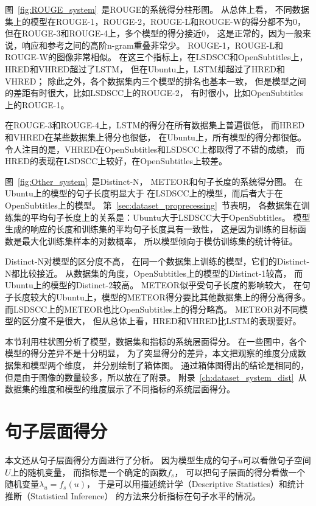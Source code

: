 
图~\ref{fig:ROUGE_system}~是ROUGE的系统得分柱形图。 从总体上看， 不同数据集上的模型在ROUGE-1，ROUGE-2，ROUGE-L和ROUGE-W的得分都不为0， 但在ROUGE-3和ROUGE-4上，多个模型的得分接近0， 这是正常的，因为一般来说，响应和参考之间的高阶n-gram重叠非常少。 ROUGE-1，ROUGE-L和ROUGE-W的图像非常相似。 在这三个指标上，在LSDSCC和OpenSubtitles上，HRED和VHRED超过了LSTM， 但在Ubuntu上，LSTM却超过了HRED和VHRED； 除此之外，各个数据集内三个模型的排名也基本一致， 但是模型之间的差距有时很大，比如LSDSCC上的ROUGE-2， 有时很小，比如OpenSubtitles上的ROUGE-1。

在ROUGE-3和ROUGE-4上，LSTM的得分在所有数据集上普遍很低， 而HRED和VHRED在某些数据集上得分也很低， 在Ubuntu上，所有模型的得分都很低。 令人注目的是，VHRED在OpenSubtitles和LSDSCC上都取得了不错的成绩， 而HRED的表现在LSDSCC上较好，在OpenSubtitles上较差。

图~\ref{fig:Other_system}~是Distinct-N， METEOR和句子长度的系统得分图。 在Ubuntu上的模型的句子长度明显大于 在LSDSCC上的模型，而后者大于在OpenSubtitles上的模型。 第~\ref{sec:dataset_proprecessing}~节表明， 各数据集在训练集的平均句子长度上的关系是：Ubuntu大于LSDSCC大于OpenSubtitles。 模型生成的响应的长度和训练集的平均句子长度具有一致性， 这是因为训练的目标函数是最大化训练集样本的对数概率， 所以模型倾向于模仿训练集的统计特征。

Distinct-N对模型的区分度不高， 在同一个数据集上训练的模型，它们的Distinct-N都比较接近。 从数据集的角度，OpenSubtitles上的模型的Distinct-1较高， 而Ubuntu上的模型的Distinct-2较高。 METEOR似乎受句子长度的影响较大， 在句子长度较大的Ubuntu上，模型的METEOR得分要比其他数据集上的得分高得多。 而LSDSCC上的METEOR也比OpenSubtitles上的得分略高。 METEOR对不同模型的区分度不是很大， 但从总体上看，HRED和VHRED比LSTM的表现要好。


本节利用柱状图分析了模型，数据集和指标的系统层面得分。 在一些图中，各个模型的得分差异不是十分明显， 为了突显得分的差异，本文把观察的维度分成数据集和模型两个维度， 并分别绘制了箱体图。 通过箱体图得出的结论是相同的，但是由于图像的数量较多，所以放在了附录。 附录~\ref{ch:dataset_system_dist}~从 数据集的维度和模型的维度展示了不同指标的系统层面得分。

\section{句子层面得分}\label{sec:utterance_scores}
本文还从句子层面得分方面进行了分析。 因为模型生成的句子$u$可以看做句子空间$U$上的随机变量， 而指标是一个确定的函数$f_{s}$， 可以把句子层面的得分看做一个随机变量$\lambda_u = f_{s}(u)$， 于是可以用描述统计学（Descriptive Statistics）和统计推断（Statistical Inference） 的方法来分析指标在句子水平的情况。

